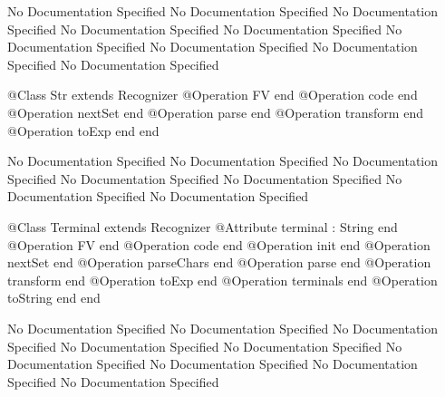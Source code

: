 No Documentation Specified
No Documentation Specified
No Documentation Specified
No Documentation Specified
No Documentation Specified
No Documentation Specified
No Documentation Specified
No Documentation Specified
No Documentation Specified
\begin{Interface}
@Class Str extends Recognizer
  @Operation FV end
  @Operation code end
  @Operation nextSet end
  @Operation parse end
  @Operation transform end
  @Operation toExp end
end
\end{Interface}
No Documentation Specified
No Documentation Specified
No Documentation Specified
No Documentation Specified
No Documentation Specified
No Documentation Specified
No Documentation Specified
\begin{Interface}
@Class Terminal extends Recognizer
  @Attribute terminal : String end
  @Operation FV end
  @Operation code end
  @Operation init end
  @Operation nextSet end
  @Operation parseChars end
  @Operation parse end
  @Operation transform end
  @Operation toExp end
  @Operation terminals end
  @Operation toString end
end
\end{Interface}
No Documentation Specified
No Documentation Specified
No Documentation Specified
No Documentation Specified
No Documentation Specified
No Documentation Specified
No Documentation Specified
No Documentation Specified
No Documentation Specified
